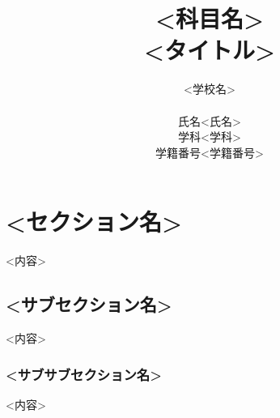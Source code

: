 \documentclass{ltjsarticle}
\begin{document}
  \title{<科目名>\\
  \huge <タイトル>}
  \author{<学校名>\\
  \begin{tabular}{rl}
    氏名 & <氏名>\\
    学科 & <学科>\\
    学籍番号 & <学籍番号>
  \end{tabular}}
  \maketitle
  \section{<セクション名>}
  <内容>
  \subsection{<サブセクション名>}
  <内容>
  \subsubsection{<サブサブセクション名>}
  <内容>
\end{document}

